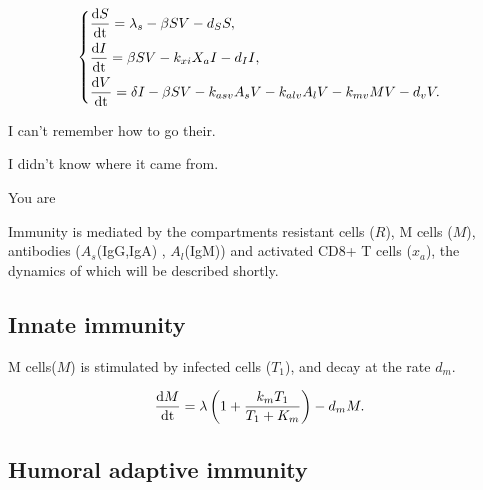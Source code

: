 \documentclass[preprint,11pt,sort&compress,square]{elsarticle}
\numberwithin{equation}{section}
\begin{document}
\begin{equation}\label{virusdynamics}
	\left\{
	\begin{aligned}
		 & \frac{{\rm d } S}{{\rm dt}}=\lambda_{s}-\beta S V-d_{S}S, \\
		 & \frac{{\rm d } I}{{\rm dt}}=\beta S V-k_{xi}X_{a}I-d_{I}I,                          \\
		 & \frac{{\rm d } V}{{\rm dt}}=\delta I-\beta SV-k_{asv}A_{s}V-k_{alv}A_{l}V-k_{mv}MV-d_{v}V.                          \\
	\end{aligned}
	\right.
\end{equation}

I can’t remember how to go their.

I didn’t know where it came from.

You are 

Immunity is mediated by the compartments resistant cells ($R$), M cells ($M$), antibodies ($A_{s}$(IgG,IgA) , $A_{l}$(IgM)) and activated CD8+ T cells ($x_{a}$), the dynamics of which will be described shortly.

\subsection{Innate immunity}



M cells($M$) is stimulated by infected cells ($T_{1}$), and decay at the rate $d_{m}$.

\begin{equation}\label{innateimmunity}
	\begin{aligned}
		 & \frac{{\rm d } M}{{\rm dt}}=\lambda\left(1+\frac{k_{m}T_{1}}{T_{1}+K_{m}}\right)-d_{m}M.   \\
	\end{aligned}
\end{equation}

\subsection{Humoral adaptive immunity}
\end{document}
